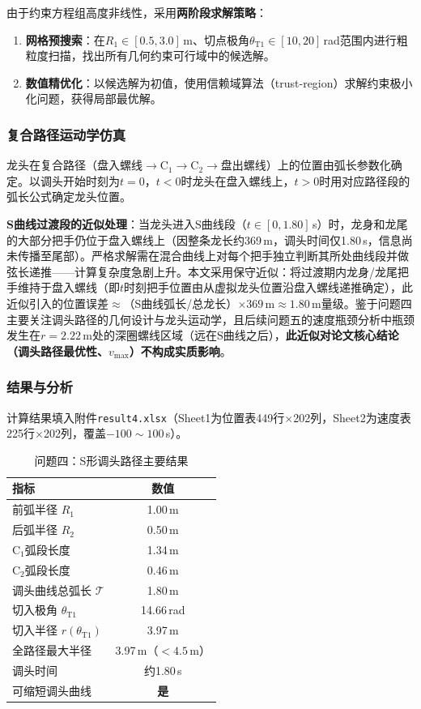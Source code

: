 \documentclass[12pt]{ctexart}
\begin{document}
由于约束方程组高度非线性，采用\textbf{两阶段求解策略}：
\begin{enumerate}[label=(\arabic*)]
  \item \textbf{网格预搜索}：在$R_1\in[0.5,3.0]$\,m、切点极角$\theta_{\text{T1}}\in[10,20]$\,rad范围内进行粗粒度扫描，找出所有几何约束可行域中的候选解。
  \item \textbf{数值精优化}：以候选解为初值，使用信赖域算法（trust-region）求解约束极小化问题，获得局部最优解。
\end{enumerate}

\subsubsection{复合路径运动学仿真}

龙头在复合路径（盘入螺线$\to$C$_1\to$C$_2\to$盘出螺线）上的位置由弧长参数化确定。以调头开始时刻为$t=0$，$t<0$时龙头在盘入螺线上，$t>0$时用对应路径段的弧长公式确定龙头位置。

\textbf{S曲线过渡段的近似处理}：当龙头进入S曲线段（$t\in[0,1.80]$\,s）时，龙身和龙尾的大部分把手仍位于盘入螺线上（因整条龙长约369\,m，调头时间仅1.80\,s，信息尚未传播至尾部）。严格求解需在混合曲线上对每个把手独立判断其所处曲线段并做弦长递推——计算复杂度急剧上升。本文采用保守近似：将过渡期内龙身/龙尾把手维持于盘入螺线（即$t$时刻把手位置由从虚拟龙头位置沿盘入螺线递推确定），此近似引入的位置误差$\approx$（S曲线弧长/总龙长）$\times 369\,\text{m}\approx 1.80\,\text{m}$量级。鉴于问题四主要关注调头路径的几何设计与龙头运动学，且后续问题五的速度瓶颈分析中瓶颈发生在$r=2.22$\,m处的深圈螺线区域（远在S曲线之后），\textbf{此近似对论文核心结论（调头路径最优性、$v_{\max}$）不构成实质影响}。

\subsubsection{结果与分析}

计算结果填入附件\texttt{result4.xlsx}（Sheet1为位置表449行$\times$202列，Sheet2为速度表225行$\times$202列，覆盖$-100\sim 100$\,s）。

\begin{table}[htbp]
\centering
\caption{问题四：S形调头路径主要结果}
\label{tab:q4_key}
\begin{tabular}{lc}
\toprule
指标 & 数值 \\
\midrule
前弧半径 $R_1$ & 1.00\,m \\
后弧半径 $R_2$ & 0.50\,m \\
C$_1$弧段长度 & 1.34\,m \\
C$_2$弧段长度 & 0.46\,m \\
调头曲线总弧长 $\mathcal{T}$ & 1.80\,m \\
切入极角 $\theta_{\text{T1}}$ & 14.66\,rad \\
切入半径 $r(\theta_{\text{T1}})$ & 3.97\,m \\
全路径最大半径 & 3.97\,m（$<4.5$\,m） \\
调头时间 & 约1.80\,s \\
可缩短调头曲线 & \textbf{是} \\
\bottomrule
\end{tabular}
\end{table}
\end{document}
